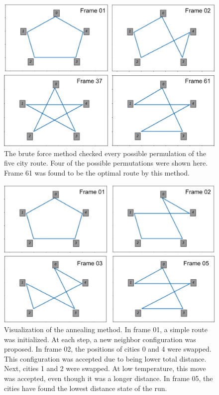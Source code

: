 \documentclass[twocolumn]{article}
\begin{document}
\begin{figure}
\centering
\includegraphics[width=\linewidth]{brute_4frames}
\caption{The brute force method checked every possible permulation of the five city route. Four of the possible permutations were shown here. Frame 61 was found to be the optimal route by this method.}
\label{fig:brute_4frames}
\end{figure}

\begin{figure}
\centering
\includegraphics[width=\linewidth]{anneal_4frames}
\caption{Visualization of the annealing method. In frame 01, a simple route was initialized. At each step, a new neighbor configuration was proposed. In frame 02, the positions of cities 0 and 4 were swapped. This configuration was accepted due to being lower total distance. Next, cities 1 and 2 were swapped. At low temperature, this move was accepted, even though it was a longer distance. In frame 05, the cities have found the lowest distance state of the run.}
\label{fig:anneal_4frames}
\end{figure}
\end{document}
